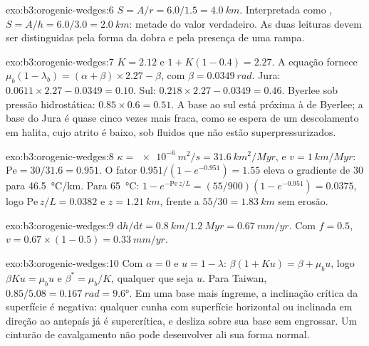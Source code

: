 \begin{solution}{exo:b3:orogenic-wedges:6}
$S = A/r = 6.0/1.5 = \qty{4.0}{km}$. Interpretada como , $S = A/h =
6.0/3.0 = \qty{2.0}{km}$: metade do valor verdadeiro. As duas leituras devem ser
distinguidas pela forma da dobra e pela presença de uma rampa.
\end{solution}

\begin{solution}{exo:b3:orogenic-wedges:7}
$K = 2.12$ e $1 + K(1 - 0.4) = 2.27$. A equação fornece $\mu_b(1 -
\lambda_b) = (\alpha + \beta)\times2.27 - \beta$, com $\beta =
\qty{0.0349}{rad}$. Jura: $0.0611\times2.27 - 0.0349 = 0.10$. Sul:
$0.218\times2.27 - 0.0349 = 0.46$. Byerlee sob pressão hidrostática:
$0.85\times0.6 = 0.51$. A base ao sul está próxima à de Byerlee; a
base do Jura é quase cinco vezes mais fraca, como se espera de um descolamento em
halita, cujo atrito é baixo, sob fluidos que não estão superpressurizados.
\end{solution}

\begin{solution}{exo:b3:orogenic-wedges:8}
$\kappa = \qty{e-6}{m^2/s} = \qty{31.6}{km^2/Myr}$, e $v =
\qty{1}{km/Myr}$: $\mathrm{Pe} = 30/31.6 = 0.951$. O fator $0.951/(1 -
e^{-0.951}) = 1.55$ eleva o gradiente de 30 para \qty{46.5}{\celsius/km}.
Para \qty{65}{\celsius}: $1 - e^{-\mathrm{Pe}\,z/L} = (55/900)(1 - e^{-0.951})
= 0.0375$, logo $\mathrm{Pe}\,z/L = 0.0382$ e $z = \qty{1.21}{km}$, frente a
$55/30 = \qty{1.83}{km}$ sem erosão.
\end{solution}

\begin{solution}{exo:b3:orogenic-wedges:9}
$\mathrm dh/\mathrm dt = \qty{0.8}{km}/\qty{1.2}{Myr} = \qty{0.67}{mm/yr}$.
Com $f = 0.5$, $v = 0.67\times(1 - 0.5) = \qty{0.33}{mm/yr}$.
\end{solution}

\begin{solution}{exo:b3:orogenic-wedges:10}
Com $\alpha = 0$ e $u = 1 - \lambda$: $\beta(1 + Ku) = \beta + \mu_b u$,
logo $\beta Ku = \mu_b u$ e $\beta^* = \mu_b/K$, qualquer que seja $u$. Para Taiwan,
$0.85/5.08 = \qty{0.167}{rad} = \ang{9.6}$. Em uma base mais íngreme, a
inclinação crítica da superfície é negativa: qualquer cunha com superfície horizontal ou inclinada em direção ao antepaís
já é supercrítica, e desliza sobre sua base sem engrossar. Um
cinturão de cavalgamento não pode desenvolver ali sua forma normal.
\end{solution}

